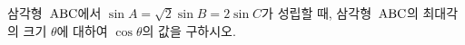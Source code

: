 삼각형~$\mathrm{ABC}$에서 $\sin A=\sqrt{2}\sin B=2\sin C$가 성립할 때, 삼각형~$\mathrm{ABC}$의 최대각의 크기 $\theta$에 대하여 $\cos\theta$의 값을 구하시오.

